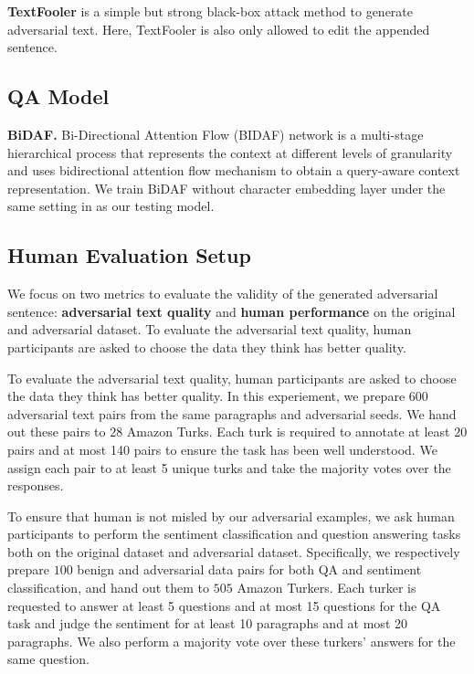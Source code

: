  \textbf{TextFooler} \citep{TextFooler} is a simple but strong black-box attack method to generate adversarial text. Here, TextFooler is also only allowed to edit the appended sentence.

\subsection{QA Model}
\textbf{{BiDAF}.} Bi-Directional Attention Flow (BIDAF) network\citep{seo2016-bidirectional} is a multi-stage hierarchical process that represents the context at different levels of granularity and uses bidirectional attention flow mechanism to obtain a query-aware context representation. We train BiDAF without character embedding layer under the same setting in \citep{seo2016-bidirectional} as our testing model.

\subsection{Human Evaluation Setup}
\label{appendix:human}

We focus on two metrics to evaluate the validity of the generated adversarial sentence:
\textbf{adversarial text quality} and  \textbf{human performance} on the original and adversarial dataset. To evaluate the adversarial text quality, human participants are asked to choose the data they think has better quality. 


To evaluate the adversarial text quality, human participants are asked to choose the data they think has better quality. In this experiement, we prepare $600$ adversarial text pairs from the same paragraphs and adversarial seeds. We hand out these pairs to $28$ Amazon Turks. Each turk is required to annotate at least 20 pairs and at most 140 pairs to ensure the task has been well understood. We assign each pair to at least 5 unique turks and take the majority votes over the responses. 


To ensure that human is not misled by our adversarial examples, we ask human participants to perform the sentiment classification and question answering tasks both on the original dataset and adversarial dataset. Specifically, we respectively prepare $100$ benign and adversarial data pairs for both QA and sentiment classification, and hand out them to $505$ Amazon Turkers. Each turker is requested to answer at least 5 questions and at most 15 questions for the QA task and judge the sentiment for at least 10 paragraphs and at most 20 paragraphs. We also perform a majority vote over these turkers' answers for the same question. 

